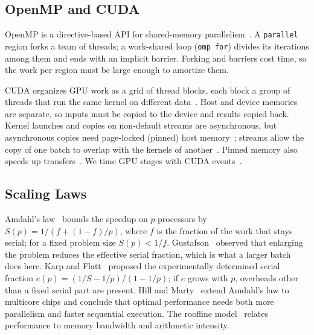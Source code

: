 \subsection{OpenMP and CUDA}
OpenMP is a directive-based API for shared-memory parallelism~\cite{dagum1998openmp,openmparb2021specification}. A \texttt{parallel} region forks a team of threads; a work-shared loop (\texttt{omp for}) divides its iterations among them and ends with an implicit barrier. Forking and barriers cost time, so the work per region must be large enough to amortize them.

CUDA organizes GPU work as a grid of thread blocks, each block a group of threads that run the same kernel on different data~\cite{nickolls2008scalable,nvidia2026cudaguide}. Host and device memories are separate, so inputs must be copied to the device and results copied back. Kernel launches and copies on non-default streams are asynchronous, but asynchronous copies need page-locked (pinned) host memory~\cite{nvidia2026cudaguide}; streams allow the copy of one batch to overlap with the kernels of another~\cite{harris2012overlap}. Pinned memory also speeds up transfers~\cite{harris2012transfers}. We time GPU stages with CUDA events~\cite{harris2012metrics}.

\subsection{Scaling Laws}
Amdahl's law~\cite{amdahl1967validity} bounds the speedup on $p$ processors by $S(p)=1/(f+(1-f)/p)$, where $f$ is the fraction of the work that stays serial; for a fixed problem size $S(p)<1/f$. Gustafson~\cite{gustafson1988reevaluating} observed that enlarging the problem reduces the effective serial fraction, which is what a larger batch does here. Karp and Flatt~\cite{karp1990measuring} proposed the experimentally determined serial fraction $e(p)=(1/S-1/p)/(1-1/p)$; if $e$ grows with $p$, overheads other than a fixed serial part are present. Hill and Marty~\cite{hill2008amdahl} extend Amdahl's law to multicore chips and conclude that optimal performance needs both more parallelism and faster sequential execution. The roofline model~\cite{williams2009roofline} relates performance to memory bandwidth and arithmetic intensity.

